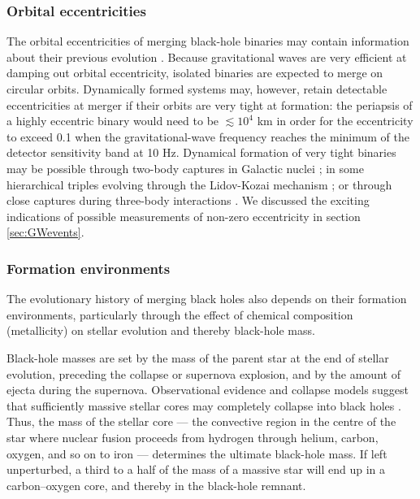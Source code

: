 \documentclass[review]{elsarticle}
\begin{document}
\subsubsection{Orbital eccentricities}\label{ecc}
	The orbital eccentricities of merging black-hole binaries may contain information about their previous evolution \citep{MandelOShaughnessy:2010}. Because gravitational waves are very efficient at damping out orbital eccentricity, isolated binaries are expected to merge on circular orbits. Dynamically formed systems may, however, retain detectable eccentricities at merger if their orbits are very tight at formation: the periapsis of a highly eccentric binary would need to be $\lesssim 10^4$ km in order for the eccentricity to exceed 0.1 when the gravitational-wave frequency reaches the minimum of the detector sensitivity band at 10 Hz.  Dynamical formation of very tight binaries may be possible through two-body captures in Galactic nuclei \citep[][but see \cite{Tsang:2013}]{OLeary:2008}; in some hierarchical triples evolving through the Lidov-Kozai mechanism \citep[e.g.,][]{AntoniniPerets:2012}; or through close captures during three-body interactions \citep{Samsing:2014, Rodriguez:2018}.  We discussed the exciting indications of possible measurements of non-zero eccentricity \citep{RomeroShaw:2021} in section \ref{sec:GWevents}.


\subsubsection{Formation environments}
\label{environ}
The evolutionary history of merging black holes also depends on their formation environments, particularly through the effect of chemical composition (metallicity) on stellar evolution and thereby black-hole mass.

Black-hole masses are set by the mass of the parent star at the end of stellar evolution, preceding the collapse or supernova explosion, and by the amount of ejecta during the supernova. Observational evidence and collapse models suggest that sufficiently massive stellar cores may completely collapse into black holes \citep[for a review, see][]{Mirabel:2016}. Thus, the mass of the stellar core --- the convective region in the centre of the star where nuclear fusion proceeds from hydrogen through helium, carbon, oxygen, and so on to iron --- determines the ultimate black-hole mass.  If left unperturbed, a third to a half of the mass of a massive star will end up in a carbon--oxygen core, and thereby in the black-hole remnant.
\end{document}
